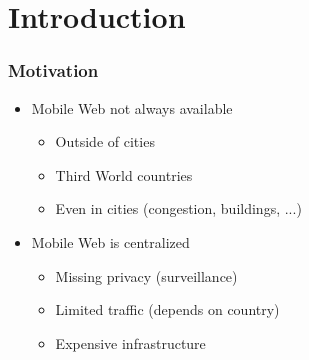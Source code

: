 \section{Introduction}

\begin{frame}
  \frametitle{Motivation}
  \begin{itemize}
    \item Mobile Web not always available
    \vspace{0.3cm}
    \begin{itemize}
      \item Outside of cities
      \vspace{0.1cm}
      \item Third World countries
      \vspace{0.1cm}
      \item Even in cities (congestion, buildings, ...)
    \end{itemize}
  \end{itemize}

  \vspace{0.3cm}

  \begin{itemize}
    \item Mobile Web is centralized
    \vspace{0.3cm}
    \begin{itemize}
      \item Missing privacy (surveillance)
      \vspace{0.1cm}
      \item Limited traffic (depends on country)
      \vspace{0.1cm}
      \item Expensive infrastructure
    \end{itemize}
  \end{itemize}
\end{frame}


